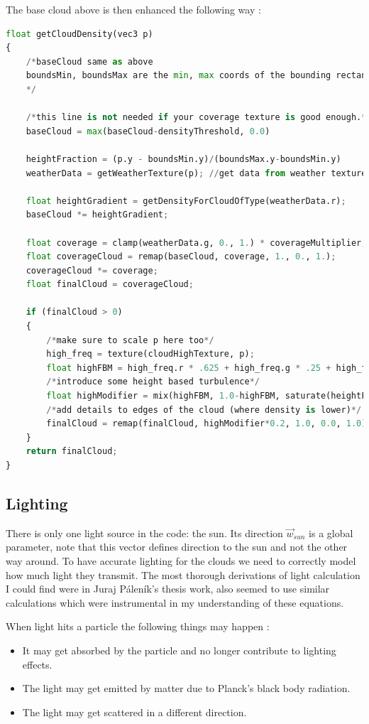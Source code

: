 The base cloud above is then enhanced the following way \cite{engel2016gpupro7} \cite{gamedevnet2015horizonzerodawn}:
\begin{lstlisting}[language=Python]
float getCloudDensity(vec3 p)
{
    /*baseCloud same as above
    boundsMin, boundsMax are the min, max coords of the bounding rectangle (AABB)
    */

    /*this line is not needed if your coverage texture is good enough.*/
    baseCloud = max(baseCloud-densityThreshold, 0.0)

    heightFraction = (p.y - boundsMin.y)/(boundsMax.y-boundsMin.y)
    weatherData = getWeatherTexture(p); //get data from weather texture

    float heightGradient = getDensityForCloudOfType(weatherData.r);
    baseCloud *= heightGradient;

    float coverage = clamp(weatherData.g, 0., 1.) * coverageMultiplier;
    float coverageCloud = remap(baseCloud, coverage, 1., 0., 1.);
    coverageCloud *= coverage;
    float finalCloud = coverageCloud;

    if (finalCloud > 0)
    {
        /*make sure to scale p here too*/
        high_freq = texture(cloudHighTexture, p);
        float highFBM = high_freq.r * .625 + high_freq.g * .25 + high_freq.b * .125;
        /*introduce some height based turbulence*/
        float highModifier = mix(highFBM, 1.0-highFBM, saturate(heightFraction * 10.0));
        /*add details to edges of the cloud (where density is lower)*/
        finalCloud = remap(finalCloud, highModifier*0.2, 1.0, 0.0, 1.0);
    }
    return finalCloud;
}
\end{lstlisting}

\subsection{Lighting}
There is only one light source in the code: the sun. Its direction $\vec{w}_{sun}$ is a global parameter, note that this vector defines direction to the sun and not the other way around. To have accurate lighting for the clouds we need to correctly model how much light they transmit. The most thorough derivations of light calculation I could find were in Juraj Páleník's \cite{palenik2016volumetricclouds} thesis work, \cite{sebestianlague2019} \cite{reinder2018} also seemed to use similar calculations which were instrumental in my understanding of these equations.

When light hits a particle the following things may happen \cite{palenik2016volumetricclouds}:
\begin{itemize}
    \item It may get absorbed by the particle and no longer contribute to lighting effects.
    \item The light may get emitted by matter due to Planck's black body radiation.
    \item The light may get scattered in a different direction.
\end{itemize}

